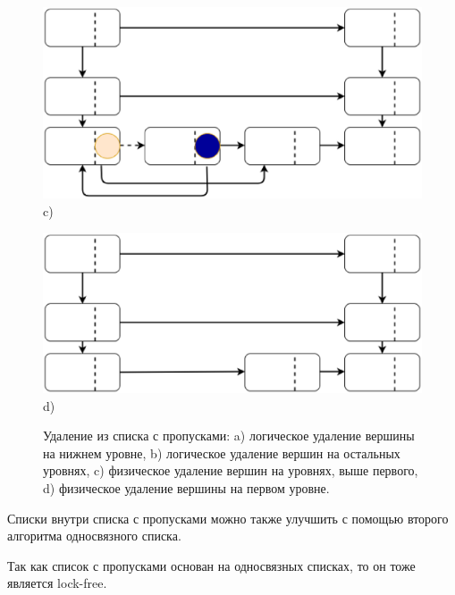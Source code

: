 \documentclass[12pt]{article}
\begin{document}
{\begin{figure}[h!]
\begin{minipage}[h]{0.45\linewidth}
					\end{minipage}
					\vfill
					\begin{minipage}[h]{0.45\linewidth}
						\centering \includegraphics[width=1\linewidth]{17} c)\\
					\end{minipage}
					\hfill
					\begin{minipage}[h]{0.45\linewidth}
						\center \includegraphics[width=1\linewidth]{18} d) \\
					\end{minipage}
					\caption{Удаление из списка с пропусками: a) логическое удаление вершины на нижнем уровне, b) логическое удаление вершин на остальных уровнях, c) физическое удаление вершин на уровнях, выше первого, d) физическое удаление вершины на первом уровне.}
					\label{pic:skiplistDelete}
				\end{figure}
				\par Списки внутри списка с пропусками можно также улучшить с помощью второго алгоритма односвязного списка.
				\par Так как список с пропусками основан на односвязных списках, то он тоже является lock-free.
}
\end{document}
